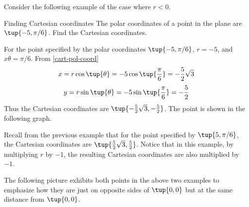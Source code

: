 Consider the following example of the case where $r < 0$. 

\begin{example}{Finding Cartesian coordinates}{}
The polar coordinates of a point in the plane are $\tup{-5,\pi /6} $.
Find the Cartesian coordinates.
\end{example}

\begin{solution}
For the point specified by the polar coordinates $\tup{-5, \pi /6 }$,
$r=-5$, and $x\theta = \pi /6$. 
From \ref{cart-pol-coord}
\[
x= r \cos \tup{\theta }= -5\cos \tup{\vspace{0.05in}\frac{\pi }{6}} = -\vspace{0.05in}\frac{5}{2}\sqrt{3}
\]
\[
y= r \sin \tup{\theta } = -5\sin \tup{\vspace{0.05in}\frac{\pi }{6}} = -\vspace{0.05in}\frac{5}{2}
\]
Thus the Cartesian coordinates are $\tup{-\vspace{0.05in}\frac{5}{2}\sqrt{3}, -\vspace{0.05in}\frac{5}{2}}$. The point is shown in the following graph.

\begin{center}
\end{center}

Recall from the previous example that for the point specified by $\tup{5, \pi /6 }$, the Cartesian coordinates are $\tup{\vspace{0.05in}\frac{5}{2}\sqrt{3}, \vspace{0.05in}\frac{5}{2}}$. Notice that in this example, by multiplying $r$ by $-1$, the resulting Cartesian coordinates are also multiplied by $-1$. 
\end{solution}

The following picture exhibits both points in the above two examples to
emphasize how they are just on opposite sides of $\tup{0,0} $ but at
the same distance from $\tup{0,0} $.

\begin{center}
\end{center}

